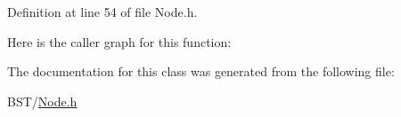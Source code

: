 Definition at line 54 of file Node.\+h.



Here is the caller graph for this function\+:




The documentation for this class was generated from the following file\+:\begin{DoxyCompactItemize}
\item 
B\+S\+T/\hyperlink{_b_s_t_2_node_8h}{Node.\+h}\end{DoxyCompactItemize}
